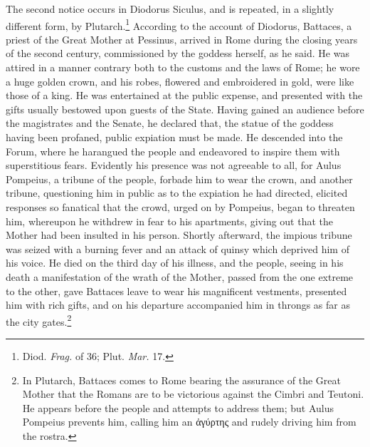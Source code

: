 \documentclass[a4paper, 11pt, oneside, polutonikogreek, english]{article}
\begin{document}
The second notice occurs in Diodorus Siculus, and is repeated, in a slightly different form, by Plutarch.\footnote{Diod. \emph{Frag.} of 36; Plut. \emph{Mar.} 17.} According to the account of Diodorus, Battaces, a priest of the Great Mother at Pessinus, arrived in Rome during the closing years of the second century, commissioned by the goddess herself, as he said. He was attired in a manner contrary both to the customs and the laws of Rome; he wore a huge golden crown, and his robes, flowered and embroidered in gold, were like those of a king. He was entertained at the public expense, and presented with the gifts usually bestowed upon guests of the State. Having gained an audience before the magistrates and the Senate, he declared that, the statue of the goddess having been profaned, public expiation must be made. He descended into the Forum, where he harangued the people and endeavored to inspire them with superstitious fears. Evidently his presence was not agreeable to all, for Aulus Pompeius, a tribune of the people, forbade him to wear the crown, and another tribune, questioning him in public as to the expiation he had directed, elicited responses so fanatical that the crowd, urged on by Pompeius, began to threaten him, whereupon he withdrew in fear to his apartments, giving out that the Mother had been insulted in his person. Shortly afterward, the impious tribune was seized with a burning fever and an attack of quinsy which deprived him of his voice. He died on the third day of his illness, and the people, seeing in his death a manifestation of the wrath of the Mother, passed from the one extreme to the other, gave Battaces leave to wear his magnificent vestments, presented him with rich gifts, and on his departure accompanied him in throngs as far as the city gates.\footnote{In Plutarch, Battaces comes to Rome bearing the assurance of the Great Mother that the Romans are to be victorious against the Cimbri and Teutoni. He appears before the people and attempts to address them; but Aulus Pompeius prevents him, calling him an ἀγύρτης and rudely driving him from the rostra.}
\end{document}
